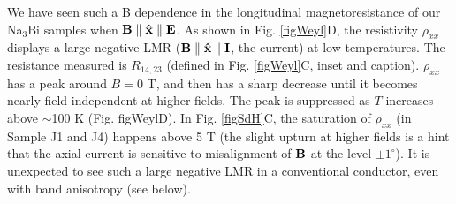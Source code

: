 %
%



We have seen such a B dependence in the longitudinal magnetoresistance of our Na$_3$Bi samples when $\bf B\parallel\hat{x}\parallel E $. As shown in Fig. \ref{figWeyl}D, the resistivity $\rho_{xx}$ displays a large negative LMR ($\bf B\parallel\hat{x}\parallel I $, the current) at low temperatures. The resistance measured is $R_{14,23}$ (defined in Fig. \ref{figWeyl}C, inset and caption). $\rho_{xx}$ has a peak around $B=0$ T, and then has a sharp decrease until it becomes nearly field independent at higher fields. The peak is suppressed as $T$ increases above $\sim$100 K (Fig. {figWeyl}D). In Fig. \ref{figSdH}C, the saturation of $\rho_{xx}$ (in Sample J1 and J4) happens above 5 T (the slight upturn at higher fields is a hint that the axial current is sensitive to misalignment of $\bf B$ at the level $\pm 1^{\circ}$). It is unexpected to see such a large negative LMR in a conventional conductor, even with band anisotropy (see below).

